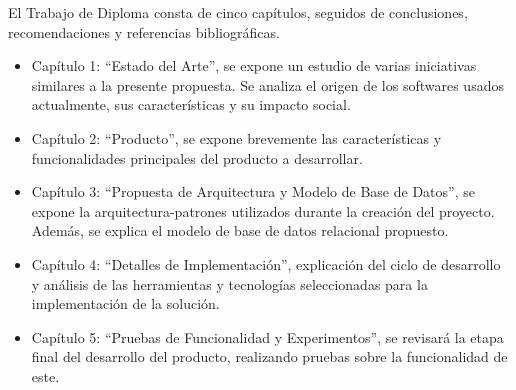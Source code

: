 El Trabajo de Diploma consta de cinco capítulos, seguidos de conclusiones, recomendaciones y referencias bibliográficas.
\begin{itemize}

\item Capítulo 1: “Estado del Arte”, se expone un estudio de varias iniciativas similares a la presente propuesta. Se analiza el origen de los softwares usados actualmente, sus características y su impacto social.

\item Capítulo 2: “Producto”, se expone brevemente las características y funcionalidades principales del producto a desarrollar.

\item Capítulo 3: “Propuesta de Arquitectura y Modelo de Base de Datos”, se expone la arquitectura-patrones utilizados durante la creación del proyecto. Además, se explica el modelo de base de datos relacional propuesto. 

\item Capítulo 4: “Detalles de Implementación”, explicación del ciclo de desarrollo y análisis de las herramientas y tecnologías seleccionadas para la implementación de la solución.

\item Capítulo 5: “Pruebas de Funcionalidad y Experimentos”, se revisará la etapa final del desarrollo del producto, realizando pruebas sobre la funcionalidad de este.

\end{itemize}
